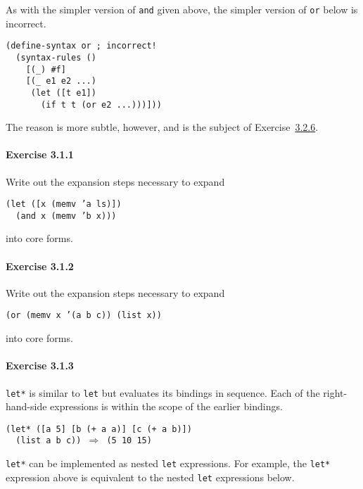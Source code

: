 As with the simpler version of \texttt{and} given above, the simpler
version of \texttt{or} below is incorrect.


\begin{alltt}
(define-syntax or ; incorrect!
  (syntax-rules ()
    [(\_{}) \#{}f]
    [(\_{} e1 e2 ...)
     (let ([t e1])
       (if t t (or e2 ...)))]))
\end{alltt}


The reason is more subtle, however, and is the subject of
Exercise \hyperref[further_g61]{3.2.6}.


\paragraph{Exercise \label{further_g51}3.1.1}


\label{further_s25}Write out the expansion steps necessary to expand


\begin{alltt}
(let ([x (memv 'a ls)])
  (and x (memv 'b x)))
\end{alltt}


into core forms.




\paragraph{Exercise \label{further_g52}3.1.2}


\label{further_s26}Write out the expansion steps necessary to expand


\texttt{(or (memv x '(a b c)) (list x))}


into core forms.


\paragraph{Exercise \label{further_g53}3.1.3}


\label{further_s27}\label{further_s28}\texttt{let*} is similar to \texttt{let} but evaluates its bindings
in sequence.
Each of the right-hand-side expressions is within the scope of
the earlier bindings.


\begin{alltt}
(let* ([a 5] [b (+ a a)] [c (+ a b)])
  (list a b c)) \(\Rightarrow\) (5 10 15)
\end{alltt}

\texttt{let*} can be implemented as nested \texttt{let} expressions.
For example, the \texttt{let*} expression above is equivalent to the nested
\texttt{let} expressions below.

